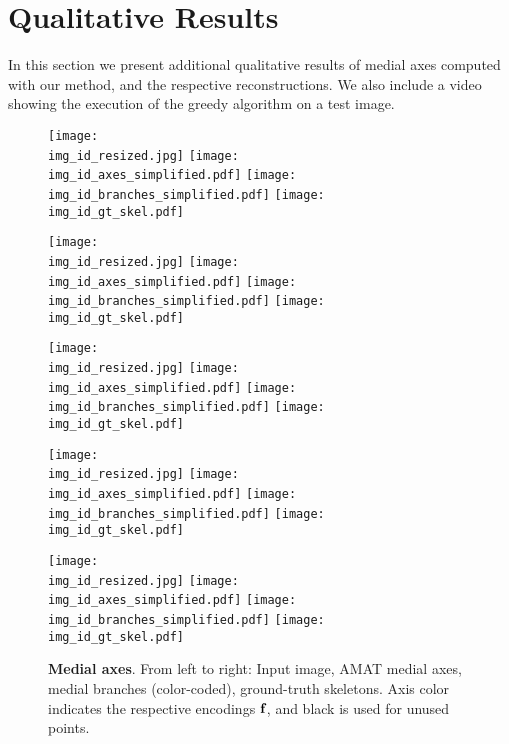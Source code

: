 \documentclass[10pt,twocolumn,letterpaper]{article}
\begin{document}
\section{Qualitative Results}\label{sec:qualitative}
In this section we present additional qualitative results of medial axes computed with our method, and the respective reconstructions.
We also include a video showing the execution of the greedy algorithm on a test image.


\begin{figure*}[t]
\centering
\def\imgw{0.245}

\def\img_id{85048}
\texttt{[image: \\img\_id\_resized.jpg]}
\texttt{[image: \\img\_id\_axes\_simplified.pdf]}
\texttt{[image: \\img\_id\_branches\_simplified.pdf]}
\texttt{[image: \\img\_id\_gt\_skel.pdf]}

\def\img_id{295087}
\texttt{[image: \\img\_id\_resized.jpg]}
\texttt{[image: \\img\_id\_axes\_simplified.pdf]}
\texttt{[image: \\img\_id\_branches\_simplified.pdf]}
\texttt{[image: \\img\_id\_gt\_skel.pdf]}

\def\img_id{145086}
\texttt{[image: \\img\_id\_resized.jpg]}
\texttt{[image: \\img\_id\_axes\_simplified.pdf]}
\texttt{[image: \\img\_id\_branches\_simplified.pdf]}
\texttt{[image: \\img\_id\_gt\_skel.pdf]}

\def\img_id{101087}
\texttt{[image: \\img\_id\_resized.jpg]}
\texttt{[image: \\img\_id\_axes\_simplified.pdf]}
\texttt{[image: \\img\_id\_branches\_simplified.pdf]}
\texttt{[image: \\img\_id\_gt\_skel.pdf]}

\def\img_id{54082}
\texttt{[image: \\img\_id\_resized.jpg]}
\texttt{[image: \\img\_id\_axes\_simplified.pdf]}
\texttt{[image: \\img\_id\_branches\_simplified.pdf]}
\texttt{[image: \\img\_id\_gt\_skel.pdf]}
\caption{\textbf{Medial axes}. From left to right: Input image, AMAT medial axes, medial branches (color-coded), ground-truth skeletons.
Axis color indicates the respective encodings $\mathbf{f}_{}$, and black is used for unused points.}
\label{fig:axes}
\end{figure*}
\end{document}
